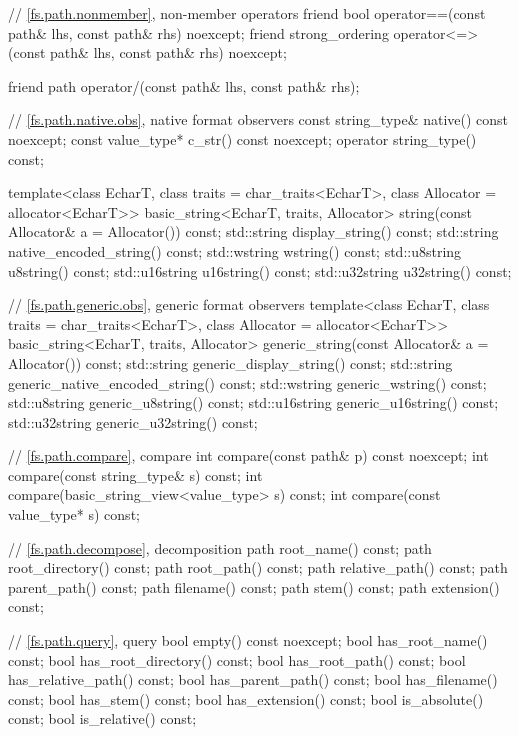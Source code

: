 \begin{codeblock}
{{    // \ref{fs.path.nonmember}, non-member operators
    friend bool operator==(const path& lhs, const path& rhs) noexcept;
    friend strong_ordering operator<=>(const path& lhs, const path& rhs) noexcept;

    friend path operator/(const path& lhs, const path& rhs);

    // \ref{fs.path.native.obs}, native format observers
    const string_type& native() const noexcept;
    const value_type*  c_str() const noexcept;
    operator string_type() const;

    template<class EcharT, class traits = char_traits<EcharT>,
             class Allocator = allocator<EcharT>>
      basic_string<EcharT, traits, Allocator>
        string(const Allocator& a = Allocator()) const;
    std::string    display_string() const;
    std::string    native_encoded_string() const;
    std::wstring   wstring() const;
    std::u8string  u8string() const;
    std::u16string u16string() const;
    std::u32string u32string() const;

    // \ref{fs.path.generic.obs}, generic format observers
    template<class EcharT, class traits = char_traits<EcharT>,
             class Allocator = allocator<EcharT>>
      basic_string<EcharT, traits, Allocator>
        generic_string(const Allocator& a = Allocator()) const;
    std::string    generic_display_string() const;
    std::string    generic_native_encoded_string() const;
    std::wstring   generic_wstring() const;
    std::u8string  generic_u8string() const;
    std::u16string generic_u16string() const;
    std::u32string generic_u32string() const;

    // \ref{fs.path.compare}, compare
    int compare(const path& p) const noexcept;
    int compare(const string_type& s) const;
    int compare(basic_string_view<value_type> s) const;
    int compare(const value_type* s) const;

    // \ref{fs.path.decompose}, decomposition
    path root_name() const;
    path root_directory() const;
    path root_path() const;
    path relative_path() const;
    path parent_path() const;
    path filename() const;
    path stem() const;
    path extension() const;

    // \ref{fs.path.query}, query
    bool empty() const noexcept;
    bool has_root_name() const;
    bool has_root_directory() const;
    bool has_root_path() const;
    bool has_relative_path() const;
    bool has_parent_path() const;
    bool has_filename() const;
    bool has_stem() const;
    bool has_extension() const;
    bool is_absolute() const;
    bool is_relative() const;

}}
\end{codeblock}
